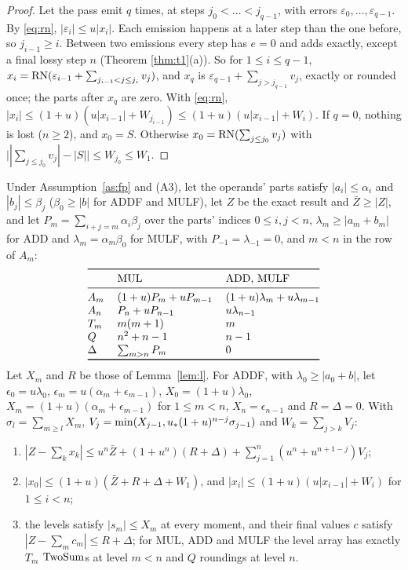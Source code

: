 \begin{proof}
Let the pass emit $q$ times, at steps $j_0 < \dots < j_{q-1}$, with errors $\varepsilon_0, \dots, \varepsilon_{q-1}$. By
\eqref{eq:rn}, $|\varepsilon_i| \le u|x_i|$. Each emission happens at a later step than the one before, so $j_{i-1}
\ge i$. Between two emissions every step has $e = 0$ and adds exactly, except a final lossy step $n$ (Theorem
\ref{thm:t1}(a)). So for $1 \le i \le q - 1$, $x_i = \mathrm{RN}(\varepsilon_{i-1} + \sum_{j_{i-1} < j \le j_i} v_j)$, and $x_q$
is $\varepsilon_{q-1} + \sum_{j > j_{q-1}} v_j$, exactly or rounded once; the parts after $x_q$ are zero. With
\eqref{eq:rn}, $|x_i| \le (1+u)(u|x_{i-1}| + W_{j_{i-1}}) \le (1+u)(u|x_{i-1}| + W_i)$. If $q = 0$, nothing is lost
($n \ge 2$), and $x_0 = S$. Otherwise $x_0 = \mathrm{RN}(\sum_{j \le j_0} v_j)$ with $\bigl||\sum_{j \le j_0} v_j| - |S|\bigr|
\le W_{j_0} \le W_1$.
\end{proof}

\begin{lemma}\label{lem:g}
Under Assumption~\ref{as:fp} and (A3), let the operands' parts satisfy $|a_i| \le \alpha_i$ and $|b_j| \le \beta_j$
($\beta_0 \ge |b|$ for ADDF and MULF), let $Z$ be the exact result and $\bar Z \ge |Z|$, and let $P_m =
\sum_{i+j=m}\alpha_i\beta_j$ over the parts' indices $0 \le i, j < n$, $\lambda_m \ge |a_m + b_m|$ for ADD and
$\lambda_m = \alpha_m\beta_0$ for MULF, with $P_{-1} = \lambda_{-1} = 0$, and $m < n$ in the row of $A_m$:
\[
\begin{tabular}{@{}lll@{}}
\toprule
& MUL & ADD, MULF \\
\midrule
$A_m$ & $(1+u)P_m + uP_{m-1}$ & $(1+u)\lambda_m + u\lambda_{m-1}$ \\
$A_n$ & $P_n + uP_{n-1}$ & $u\lambda_{n-1}$ \\
$T_m$ & $m(m+1)$ & $m$ \\
$Q$ & $n^2 + n - 1$ & $n-1$ \\
$\Delta$ & $\sum_{m > n}P_m$ & $0$ \\
\bottomrule
\end{tabular}
\]
Let $X_m$ and $R$ be those of Lemma~\ref{lem:l}. For
ADDF, with $\lambda_0 \ge |a_0 + b|$, let $\epsilon_0 = u\lambda_0$, $\epsilon_m = u(\alpha_m + \epsilon_{m-1})$, $X_0
= (1+u)\lambda_0$, $X_m = (1+u)(\alpha_m + \epsilon_{m-1})$ for $1 \le m < n$, $X_n = \epsilon_{n-1}$ and $R = \Delta =
0$. With $\sigma_l = \sum_{m \ge l}X_m$, $V_j = \min(X_{j-1}, u_{*}(1+u)^{n-j}\sigma_{j-1})$ and $W_k = \sum_{j > k}V_j$:
\begin{enumerate}
\item[(a)] $|Z - \sum_k x_k| \le u^n\bar Z + (1+u^n)(R+\Delta) + \sum_{j=1}^n (u^n + u^{n+1-j})V_j$;
\item[(b)] $|x_0| \le (1+u)(\bar Z + R + \Delta + W_1)$, and $|x_i| \le (1+u)(u|x_{i-1}| + W_i)$ for $1 \le i < n$;
\item[(c)] the levels satisfy $|s_m| \le X_m$ at every moment, and their final values $c$ satisfy $|Z - \sum_m c_m| \le
  R + \Delta$; for MUL, ADD and MULF the level array has exactly $T_m$ $\mathrm{TwoSum}$s at level $m < n$ and $Q$ roundings at
  level $n$.
\end{enumerate}
\end{lemma}

